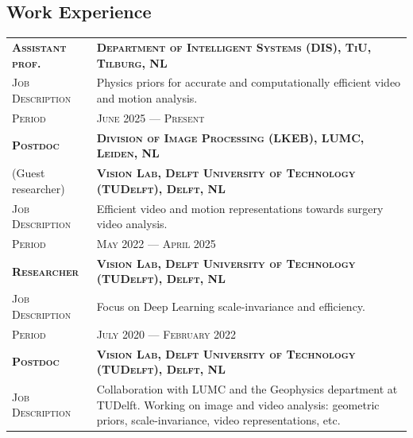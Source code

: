 \documentclass[a4paper, oneside, final]{scrartcl}
\newcommand{\gray}{\rowcolor[gray]{.90}}
\begin{document}
\begin{center}
		\section{Work Experience}
        \begin{tabular}{p{3.5cm}@{\hskip 0.3in}p{12.3cm}}
			\gray \textsc{\textbf{Assistant prof.}} & \textsc{\textbf{Department of Intelligent Systems (DIS), TiU, Tilburg, NL}}\\
			\textsc{Job Description}               & Physics priors for accurate and computationally efficient video and motion analysis.\\ 
			\textsc{Period}                        & \textsc{June 2025 --- Present} 
            \vspace{5px}\\
			\gray \textsc{\textbf{Postdoc}} & \textsc{\textbf{Division of Image Processing (LKEB), LUMC, Leiden, NL}}\\
            \gray (Guest researcher)               & \textsc{\textbf{Vision Lab, Delft University of Technology (TUDelft), Delft, NL}}\\
			\textsc{Job Description}               & Efficient video and motion representations towards surgery video analysis.\\ 
			\textsc{Period}                        & \textsc{May 2022 --- April 2025} 
            \vspace{5px}\\
			\gray \textsc{\textbf{Researcher}} & \textsc{\textbf{Vision Lab, Delft University of Technology (TUDelft), Delft, NL}}\\
			\textsc{Job Description}            & Focus on Deep Learning scale-invariance and efficiency.\\
			\textsc{Period}                     & \textsc{July 2020 --- February 2022} 
            \vspace{5px}\\
			\gray \textsc{\textbf{Postdoc}}     & \textsc{\textbf{Vision Lab, Delft University of Technology (TUDelft), Delft, NL}}\\
			\textsc{Job Description}            & Collaboration with LUMC and the Geophysics department at TUDelft.
                                                Working on image and video analysis: geometric priors, scale-invariance, video representations, etc.\\

\end{tabular}
\end{center}
\end{document}
